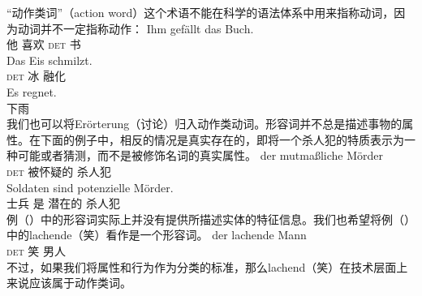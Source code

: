“动作类词”（action word）这个术语不能在科学的语法体系中用来指称动词，因为动词并不一定指称动作：
\eal
\ex
\gll Ihm gefällt das Buch.\\
	 他 喜欢 \textsc{det} 书\\
\ex 
\gll Das Eis schmilzt.\\
	 \textsc{det} 冰  融化\\
\ex 
\gll Es regnet.\\
	 \expl{} 下雨\\
\zl
我们也可以将Erörterung（讨论）归入动作类动词。形容词并不总是描述事物的属性。在下面的例子中，相反的情况是真实存在的，即将一个杀人犯的特质表示为一种可能或者猜测，而不是被修饰名词的真实属性。
\eal
\ex 
\gll der mutmaßliche Mörder\\
     \textsc{det} 被怀疑的 杀人犯\\
\ex 
\gll Soldaten sind potenzielle Mörder.\\
     士兵 是 潜在的 杀人犯\\
\zl
例（）中的形容词实际上并没有提供所描述实体的特征信息。我们也希望将例（）中的lachende（笑）看作是一个形容词。
\ea
\gll der lachende Mann\\
	 \textsc{det} 笑 男人\\
\z
不过，如果我们将属性和行为作为分类的标准，那么lachend（笑）在技术层面上来说应该属于动作类词。

